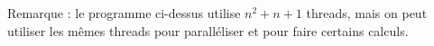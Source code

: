 \begin{exercice}[Parallélisation]
\begin{correction}
    Remarque : le programme ci-dessus utilise $n^2 + n + 1$ threads, mais on peut utiliser les mêmes threads pour paralléliser et pour faire certains calculs.
  \end{correction}
  
\end{exercice}

\endgroup
\endinput

